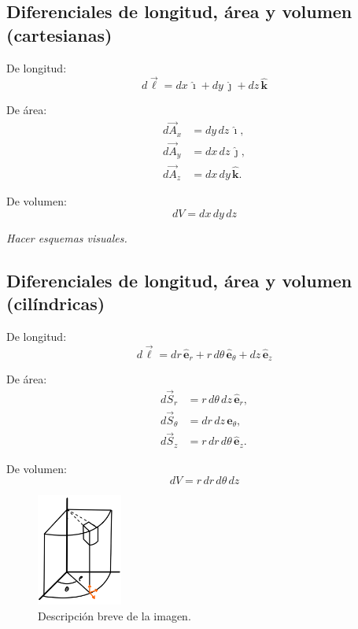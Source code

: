 \documentclass[a4paper,12pt]{article}
\begin{document}
\subsection{Diferenciales de longitud, área y volumen (cartesianas)}

De longitud:
\[
d\vec{\ell} = dx\,\hat{\imath} + dy\,\hat{\jmath} + dz\,\hat{\mathbf k}
\]

De área:
\[
\begin{aligned}
d\vec{A}_x &= dy\,dz\,\hat{\imath},\\
d\vec{A}_y &= dx\,dz\,\hat{\jmath},\\
d\vec{A}_z &= dx\,dy\,\hat{\mathbf k}.
\end{aligned}
\]

De volumen:
\[
dV = dx\,dy\,dz
\]

\textit{Hacer esquemas visuales.}


\subsection{Diferenciales de longitud, área y volumen (cilíndricas)}

De longitud:
\[
d\vec{\ell} = dr\,\hat{\mathbf e}_r + r\,d\theta\,\hat{\mathbf e}_\theta + dz\,\hat{\mathbf e}_z
\]

De área:
\[
\begin{aligned}
d\vec{S}_r      &= r\,d\theta\,dz\,\hat{\mathbf e}_r,\\
d\vec{S}_\theta &= dr\,dz\,\hat{\mathbf e}_\theta,\\
d\vec{S}_z      &= r\,dr\,d\theta\,\hat{\mathbf e}_z.
\end{aligned}
\]

De volumen:
\[
dV = r\,dr\,d\theta\,dz
\]
\vspace{-2.0em}
\begin{figure}[h]
  \centering
  \includegraphics[width=0.25\textwidth]{imagen_7.jpeg}
  \caption{Descripción breve de la imagen.}
  \label{fig:imagen7}
\end{figure}
\end{document}
